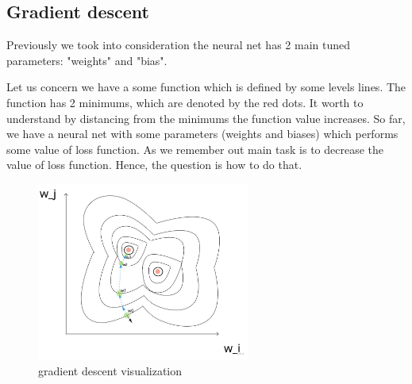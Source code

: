 \subsection{Gradient descent}
Previously we took into consideration the neural net has 2 main tuned parameters: "weights" and "bias".

Let us concern we have a some function which is defined by some levels lines. The function has 2 minimums, which are denoted by the red dots.  It worth to understand by distancing from the minimums the function value increases. 
So far, we have a neural net with some parameters (weights and biases) which performs some value of loss function. As we remember out main task is to decrease the value of loss function. Hence, the question is how to do that.

\begin{figure}[h]
    \centering \includegraphics[width=7cm]{images/gradient_descent.jpg}
    \caption {gradient descent visualization}
\end{figure}

